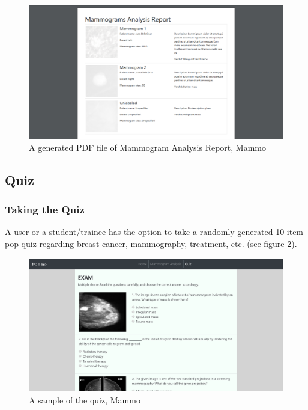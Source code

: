 \documentclass[11pt,a4paper,titlepage]{article}
\newcommand{\+}{\discretionary{\mbox{${\bm\cdot}\mkern-1mu$}}{}{}}
\begin{document}
	\begin{figure}[h]
		\centering
	  	\includegraphics[scale=0.5]{images/mammogramPDF.png}
		 \caption{A generated PDF file of Mammogram Analysis Report, Mammo}
	  	\label{fig:mammogramPDF}
	\end{figure}
	
	\subsection{Quiz}
	
	\subsubsection{Taking the Quiz}
	\qquad A user or a student/trainee has the option to take a randomly-generated 10-item pop quiz regarding breast cancer, mammography, treatment, etc. (see figure \ref{fig:mammogramExam}).
	
	\begin{figure}[h]
		\centering
	  	\includegraphics[scale=0.5]{images/mammogramExam.png}
		 \caption{A sample of the quiz, Mammo}
	  	\label{fig:mammogramExam}
	\end{figure}
	
\end{document}
